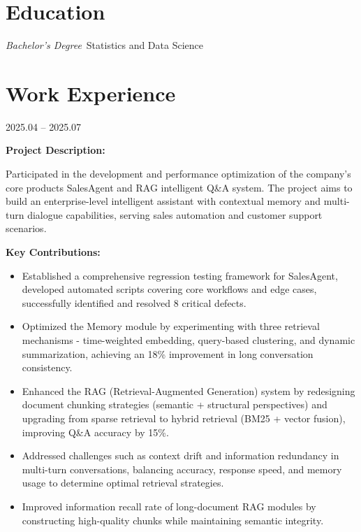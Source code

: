 \documentclass{resume}
\begin{document}



\vspace{-2ex}
\section{Education}
\textit{Bachelor's Degree}\ Statistics and Data Science

\vspace{-1.8ex}
\section{Work Experience}
 {2025.04 -- 2025.07}

\textbf{Project Description:}

Participated in the development and performance optimization of the company's core products SalesAgent and RAG intelligent Q\&A system. The project aims to build an enterprise-level intelligent assistant with contextual memory and multi-turn dialogue capabilities, serving sales automation and customer support scenarios.

\textbf{Key Contributions:}
\begin{itemize}
    \item Established a comprehensive regression testing framework for SalesAgent, developed automated scripts covering core workflows and edge cases, successfully identified and resolved 8 critical defects.
    \item Optimized the Memory module by experimenting with three retrieval mechanisms - time-weighted embedding, query-based clustering, and dynamic summarization, achieving an 18\% improvement in long conversation consistency.
    \item Enhanced the RAG (Retrieval-Augmented Generation) system by redesigning document chunking strategies (semantic + structural perspectives) and upgrading from sparse retrieval to hybrid retrieval (BM25 + vector fusion), improving Q\&A accuracy by 15\%.
    \item Addressed challenges such as context drift and information redundancy in multi-turn conversations, balancing accuracy, response speed, and memory usage to determine optimal retrieval strategies.
    \item Improved information recall rate of long-document RAG modules by constructing high-quality chunks while maintaining semantic integrity.
\end{itemize}
\end{document}
